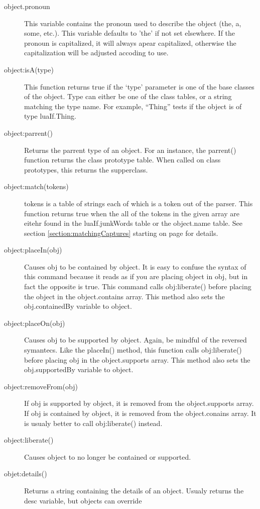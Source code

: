 \documentclass{book}
\newcommand{\myref}[1]{\ref{#1} starting on page \pageref{#1}}
\begin{document}
\begin{description}
\item[object.pronoun] This variable contains the pronoun used to
  describe the object (the, a, some, etc.). This variable defaults to
  'the' if not set elsewhere. If the pronoun is capitalized, it will
  always apear capitalized, otherwise the capitalization will be
  adjusted accoding to use.
\item[object:isA(type)] This function returns true if the `type'
  parameter is one of the base classes of the object. Type can either
  be one of the class tables, or a string matching the type name. For
  example, ``Thing'' tests if the object is of type luaIf.Thing.
\item[object:parrent()] Returns the parrent type of an object. For an
  instance, the parrent() function returns the class prototype
  table. When called on class prototypes, this returns the
  supperclass.
\item[object:match(tokens)] tokens is a table of strings each of which
  is a token out of the parser. This function returns true when the
  all of the tokens in the given array are eitehr found in the
  luaIf.junkWords table or the object.name table. See
  section \myref{section:matchingCaptures} for details.
\item[object:placeIn(obj)] Causes obj to be contained by
  object. It is easy to confuse the syntax of this command because it
  reads as if you are placing object in obj, but in fact the opposite
  is true. This command calls obj:liberate() before placing the object
  in the object.contains array. This method also sets the
  obj.containedBy variable to object.
\item[object:placeOn(obj)] Causes obj to be supported by
  object. Again, be mindful of the reversed symantecs. Like the
  placeIn() method, this function calls obj:liberate() before placing
  obj in the object.supports array. This method also sets the
  obj.supportedBy variable to object.
\item[object:removeFrom(obj)] If obj is supported by object, it is
  removed from the object.supports array. If obj is contained by
  object, it is removed from the object.conains array. It is usualy
  better to call obj:liberate() instead.
\item[object:liberate()] Causes object to no longer be contained or supported.
\item[objet:details()] Returns a string containing the details of an
  object. Usualy returns the desc variable, but objects can override

\end{description}
\end{document}
